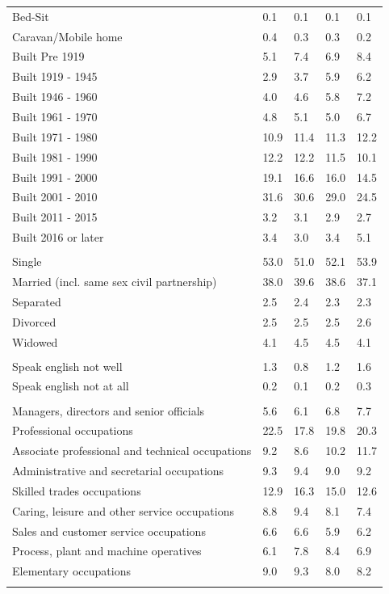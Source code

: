 \documentclass{article}
\begin{document}
\begin{table}[h]
\begin{tabular}{KTTTT}
Bed-Sit & 0.1& 0.1& 0.1& 0.1\\
Caravan/Mobile home & 0.4& 0.3& 0.3& 0.2\\
    \hline
Built Pre 1919 & 5.1& 7.4& 6.9& 8.4\\
Built 1919 - 1945 & 2.9& 3.7& 5.9& 6.2\\
Built  1946 - 1960 & 4.0& 4.6& 5.8& 7.2\\
Built  1961 - 1970 & 4.8& 5.1& 5.0& 6.7\\
Built  1971 - 1980 & 10.9& 11.4& 11.3& 12.2\\
Built  1981 - 1990 & 12.2& 12.2& 11.5& 10.1\\
Built  1991 - 2000 & 19.1& 16.6& 16.0& 14.5\\
Built  2001 - 2010 & 31.6& 30.6& 29.0& 24.5\\
Built  2011 - 2015 & 3.2& 3.1& 2.9& 2.7\\
Built  2016 or later & 3.4& 3.0& 3.4& 5.1\\
\hline
    \\
    \hline
Single & 53.0& 51.0& 52.1& 53.9\\
Married (incl. same sex civil partnership) & 38.0& 39.6& 38.6& 37.1\\
Separated  & 2.5& 2.4& 2.3& 2.3\\
Divorced  & 2.5& 2.5& 2.5& 2.6\\
Widowed & 4.1& 4.5& 4.5& 4.1\\
\hline
    \\ 
    \hline
Speak english not well & 1.3& 0.8& 1.2& 1.6\\
Speak english not at all & 0.2& 0.1& 0.2& 0.3\\
\hline
    \\
    \hline
Managers, directors and senior officials & 5.6& 6.1& 6.8& 7.7\\
Professional occupations & 22.5& 17.8& 19.8& 20.3\\
Associate professional and technical occupations &  9.2&  8.6& 10.2& 11.7\\
Administrative and secretarial occupations & 9.3& 9.4& 9.0& 9.2\\
Skilled trades occupations & 12.9& 16.3& 15.0& 12.6\\
Caring, leisure and other service occupations & 8.8& 9.4& 8.1& 7.4\\
Sales and customer service occupations & 6.6& 6.6& 5.9& 6.2\\
Process, plant and machine operatives & 6.1& 7.8& 8.4& 6.9\\
Elementary occupations & 9.0& 9.3& 8.0& 8.2\\
\hline
\end{tabular}
\end{table}
\end{document}
